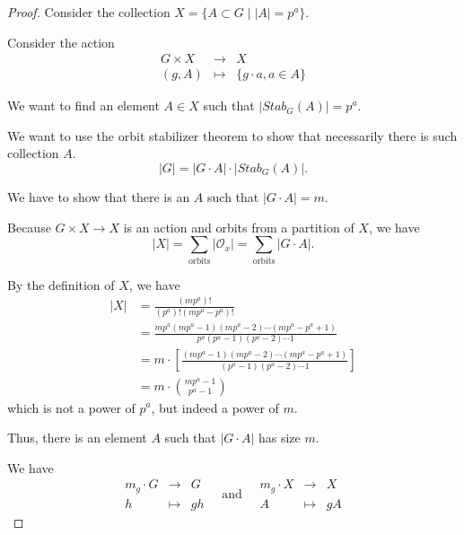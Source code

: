 \begin{proof}
    Consider the collection $X = \{ A \subset G \mid |A| = p^a \}$.

    Consider the action \[ \begin{matrix}
        G \times X & \to & X \\
        (g, A)    & \mapsto & \{ g \cdot a, a \in A \}
    \end{matrix} \]

    We want to find an element $A \in X$ such that $|Stab_G(A)| = p^a$.

    We want to use the orbit stabilizer theorem to show that necessarily there is such collection $A$. \[
        |G| = | G \cdot A | \cdot | Stab_G(A) |.
    \]

    We have to show that there is an $A$ such that $|G \cdot A| = m$.

    Because $G \times X \to X$ is an action and orbits from a partition of $X$, we have \[
        |X| = \sum_{\text{orbits}} | \mathcal{O}_x | = \sum_{\text{orbits}} | G \cdot A |.
    \]

    By the definition of $X$, we have \begin{align*}
        |X| & = \frac{(mp^a)!}{(p^a)! (mp^a - p^a)!}                                                                    \\
            & = \frac{mp^a(mp^a - 1)(mp^a - 2) \cdots (mp^a - p^a + 1)}{p^a (p^a - 1)(p^a - 2) \cdots 1}                \\
            & = m \cdot \left[ \frac{(mp^a - 1)(mp^a - 2) \cdots (mp^a - p^a + 1)}{(p^a - 1)(p^a - 2) \cdots 1} \right] \\
            & = m \cdot \binom{mp^a-1}{p^a-1}
    \end{align*} which is not a power of $p^a$, but indeed a power of $m$.

    Thus, there is an element $A$ such that $|G \cdot A|$ has size $m$. 

    We have \[
        \begin{matrix}
            m_g \cdot G & \to & G \\
            h          & \mapsto & gh
        \end{matrix}
        \quad \text{and} \quad
        \begin{matrix}
            m_g \cdot X & \to & X \\
            A          & \mapsto & gA
        \end{matrix}
    \]


\end{proof}
